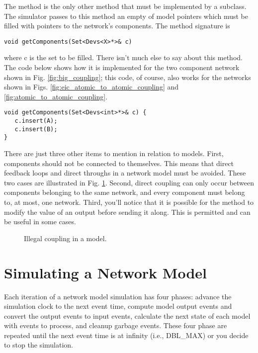 The  method is the only other method that must be implemented by a  subclass. The simulator passes to this method an empty  of model pointers which must be filled with pointers to the network's components. The  method signature is
\begin{verbatim}
void getComponents(Set<Devs<X>*>& c) 
\end{verbatim}
where c is the set to be filled.
There isn't much else to say about this method. The code below shows how it is implemented for the two component network shown in Fig. \ref{fig:big_coupling}; this code, of course, also works for the networks shown in Figs. \ref{fig:eic_atomic_to_atomic_coupling} and \ref{fig:atomic_to_atomic_coupling}.
\begin{verbatim}
void getComponents(Set<Devs<int>*>& c) { 
   c.insert(A);
   c.insert(B);
}
\end{verbatim}

There are just three other items to mention in relation to  models. First, components should not be connected to themselves. This means that direct feedback loops and direct throughs in a network model must be avoided. These two cases are illustrated in Fig. \ref{fig:bad_coupling}. Second, direct coupling can only occur between components belonging to the same network, and every component must belong to, at most, one network. Third, you'll notice that it is possible for the  method to modify the value of an output before sending it along. This is permitted and can be useful in some cases.
\begin{figure}[ht]
\centering
{}
\caption{Illegal coupling in a  model.}
\label{fig:bad_coupling}
\end{figure}

\section{Simulating a Network Model}
Each iteration of a network model simulation has four phases: advance the simulation clock to the next event time, compute model output events and convert the output events to input events, calculate the next state of each model with events to process, and cleanup garbage events. These four phase are repeated until the next event time is at infinity (i.e., DBL\_MAX) or you decide to stop the simulation. 

